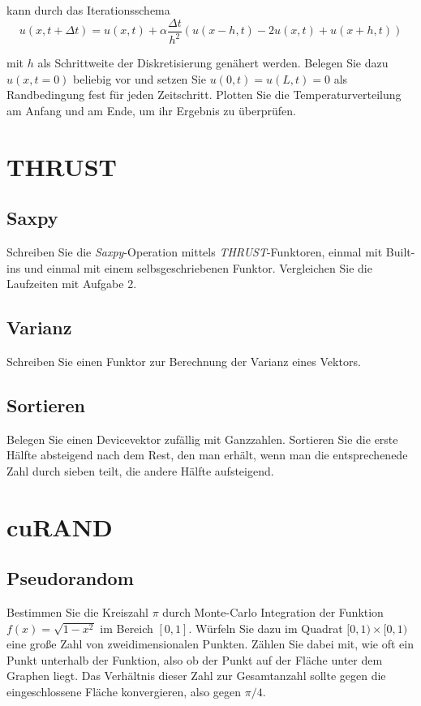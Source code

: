 \documentclass[headsepline=3pt,headinclude=true,12pt,oneside]{scrartcl}
\begin{document}
	kann durch das Iterationsschema
	\begin{equation}\label{tps}
		u(x,t + \Delta t) = u(x,t) + \alpha \frac{\Delta t}{h^2}(u(x-h,t)-2u(x,t)+u(x+h,t))
	\end{equation}
	
	mit $h$ als Schrittweite der Diskretisierung genähert werden. Belegen Sie dazu $u(x,t=0)$ beliebig vor und setzen Sie $u(0,t)=u(L,t)=0$ als Randbedingung fest für jeden Zeitschritt. Plotten Sie die Temperaturverteilung am Anfang und am Ende, um ihr Ergebnis zu überprüfen.	
		
	\section{THRUST}
		\subsection*{Saxpy}
		Schreiben Sie die \textit{Saxpy}-Operation mittels \textit{THRUST}-Funktoren, einmal mit Built-ins und einmal mit einem selbsgeschriebenen Funktor. Vergleichen Sie die Laufzeiten mit Aufgabe 2.
		
		\subsection*{Varianz}
		Schreiben Sie einen Funktor zur Berechnung der Varianz eines Vektors.		
		
		\subsection{Sortieren}
		Belegen Sie einen Devicevektor zufällig mit Ganzzahlen. Sortieren Sie die erste Hälfte absteigend nach dem Rest, den man erhält, wenn man die entsprechenede Zahl durch sieben teilt, die andere Hälfte aufsteigend. 
			
			
		\section{cuRAND}
			\subsection{Pseudorandom}
			Bestimmen Sie die Kreiszahl $\pi$ durch Monte-Carlo Integration der Funktion $f(x) = \sqrt{1-x^2}$ im Bereich $[0,1]$. Würfeln Sie dazu im Quadrat $[0,1)\times[0,1)$ eine große Zahl von zweidimensionalen Punkten. Zählen Sie dabei mit, wie oft ein Punkt unterhalb der Funktion, also ob der Punkt auf der Fläche unter dem Graphen liegt. Das Verhältnis dieser Zahl zur Gesamtanzahl sollte gegen die eingeschlossene Fläche konvergieren, also gegen $\pi/4$.
\end{document}
